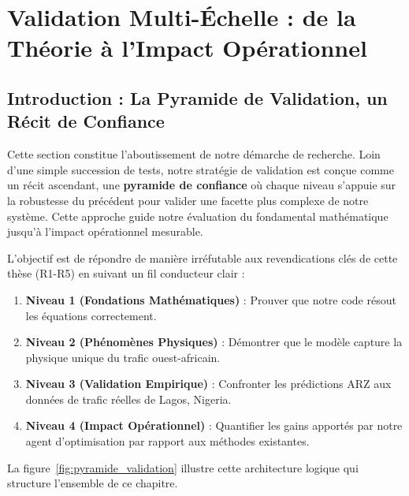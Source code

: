 
\section{Validation Multi-Échelle : de la Théorie à l'Impact Opérationnel}
\label{sec:validation_multiechelle}

\subsection{Introduction : La Pyramide de Validation, un Récit de Confiance}
\label{sec:pyramide_validation}

Cette section constitue l'aboutissement de notre démarche de recherche. Loin d'une simple succession de tests, notre stratégie de validation est conçue comme un récit ascendant, une \textbf{pyramide de confiance} où chaque niveau s'appuie sur la robustesse du précédent pour valider une facette plus complexe de notre système. Cette approche guide notre évaluation du fondamental mathématique jusqu'à l'impact opérationnel mesurable.

L'objectif est de répondre de manière irréfutable aux revendications clés de cette thèse (R1-R5) en suivant un fil conducteur clair :
\begin{enumerate}
    \item \textbf{Niveau 1 (Fondations Mathématiques)} : Prouver que notre code résout les équations correctement.
    \item \textbf{Niveau 2 (Phénomènes Physiques)} : Démontrer que le modèle capture la physique unique du trafic ouest-africain.
    \item \textbf{Niveau 3 (Validation Empirique)} : Confronter les prédictions ARZ aux données de trafic réelles de Lagos, Nigeria.
    \item \textbf{Niveau 4 (Impact Opérationnel)} : Quantifier les gains apportés par notre agent d'optimisation par rapport aux méthodes existantes.
\end{enumerate}

La figure~\ref{fig:pyramide_validation} illustre cette architecture logique qui structure l'ensemble de ce chapitre.

